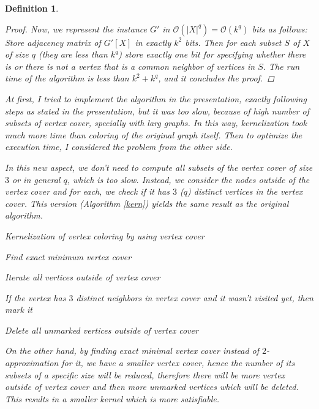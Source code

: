 \documentclass[12pt]{article}
\theoremstyle{slplain}
\newtheorem{defi}{Definition}
\begin{document}
\begin{defi}
\begin{proof}
Now, we represent the instance $G'$ in $\mathcal{O}(|X|^q) = \mathcal{O}(k^q)$ bits as follows: Store 
adjacency matrix of $G'[X]$ in exactly $k^2$ bits. Then for each subset $S$ of $X$ 
of size $q$ (they are less than $k^q$) store exactly one bit for specifying whether 
there is or there is not a vertex that is a common neighbor of vertices in $S$. The 
run time of the algorithm is less than $k^2 + k^q$, and it concludes the proof.
\end{proof}
\vspace{1cm}

At first, I tried to implement the algorithm in the presentation, exactly following steps as stated in the presentation, but it was too slow, because of high number of subsets of vertex cover, specially with larg graphs. In this way, kernelization took much more time than coloring of the original graph itself. Then to optimize the execution time, I considered the problem from the other side. 

In this new aspect, we don't need to compute all subsets of the vertex cover of size $3$ or in general $q$, which is too slow. Instead, we consider the nodes outside of the vertex cover and for each, we check if it has $3$ ($q$) distinct vertices in the vertex cover. This version (Algorithm \ref{kern}) yields the same result as the original algorithm. 

\vspace{1cm}

\begin{algorithm}[H]
\SetAlgoLined
\DontPrintSemicolon
  \caption{Kernelization of vertex coloring by using vertex cover}{\label{kern}}

Find exact minimum vertex cover\;

Iterate all vertices outside of vertex cover\;

If the vertex has $3$ distinct neighbors in vertex cover and it wasn't
visited yet, then mark it\;

Delete all unmarked vertices outside of vertex cover\;
\end{algorithm}

\vspace{1cm}

On the other hand, by finding exact minimal vertex cover instead of $2$-approximation for it, we have a smaller vertex cover, hence the number of its subsets of a specific size will be reduced, therefore there will be more vertex outside of vertex cover and then more unmarked vertices which will be deleted. This results in a smaller kernel which is more satisfiable.



\end{defi}
\end{document}
